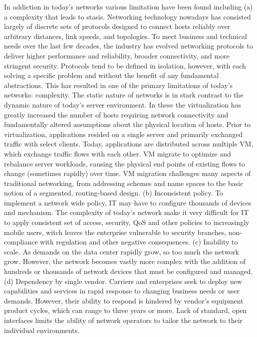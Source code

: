 In addiction in today's networks various limitation have been found including (a) a complexity that leads to stasis. Networking technology nowadays has consisted largely of discrete sets of protocols designed to connect hosts reliably over arbitrary distances, link speeds, and topologies. To meet business and technical needs over the last few decades, the industry has evolved networking protocols to deliver higher performance and reliability, broader connectivity, and more stringent security. Protocols tend to be defined in isolation, however, with each solving a specific problem and without the benefit of any fundamental abstractions. This has resulted in one of the primary limitations of today's networks: complexity. The static nature of networks is in stark contrast to the dynamic nature of today's server environment. In these the virtualization has greatly increased the number of hosts requiring network connectivity and fundamentally altered assumptions about the physical location of hosts. Prior to virtualization, applications resided on a single server and primarily exchanged traffic with select clients. Today, applications are distributed across multiple \ac{VM}, which exchange traffic flows with each other. \ac{VM} migrate to optimize and rebalance server workloads, causing the physical end points of existing flows to change (sometimes rapidly) over time. \ac{VM} migration challenges many aspects of traditional networking, from addressing schemes and name spaces to the basic notion of a segmented, routing-based design. (b) Inconsistent policy. To implement a network wide policy, \ac{IT} may have to configure thousands of devices and mechanism. The complexity of today's network make it very difficult for \ac{IT} to apply consistent set of access, security, \ac{QoS} and other policies to increasingly mobile users, witch leaves the enterprise vulnerable to security branches, non-compliance with regulation and other negative consequences. (c) Inability to scale. As demands on the data center rapidly grow, so too much the network grow. However, the network becomes vastly more complex with the addition of hundreds or thousands of network devices that must be configured and managed. (d) Dependency by single vendor. Carriers and enterprises seek to deploy new capabilities and services in rapid response to changing business needs or user demands. However, their ability to respond is hindered by vendor's equipment product cycles, which can range to three years or more. Lack of standard, open interfaces limits the ability of network operators to tailor the network to their individual environments.

